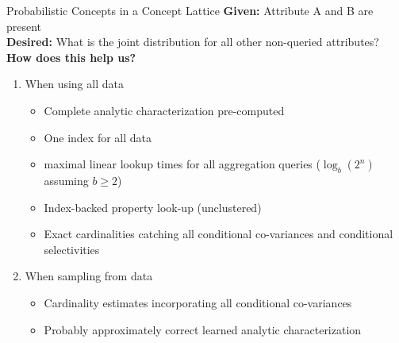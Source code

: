\documentclass[rgb]{beamer}
\begin{document}
    \begin{frame}{Probabilistic Concepts in a Concept Lattice}
        \textbf{Given:} Attribute A and B are present \\
        \textbf{Desired:} What is the joint distribution for all other non-queried attributes? \\
        \textbf{How does this help us?} 
        \begin{enumerate}
            \item When using all data \\
            \begin{itemize}
                \item Complete analytic characterization pre-computed
                \item One index for all data
                \item maximal linear lookup times for all aggregation queries ($\log_b (2^n)$ assuming $b \geq 2$)
                \item Index-backed property look-up (unclustered)
                \item Exact cardinalities catching all conditional co-variances and conditional selectivities
            \end{itemize}
            \item When sampling from data
            \begin{itemize}
                \item Cardinality estimates incorporating all conditional co-variances
                \item Probably approximately correct learned analytic characterization
            \end{itemize}
        \end{enumerate}
        
    \end{frame}
    
\end{document}

